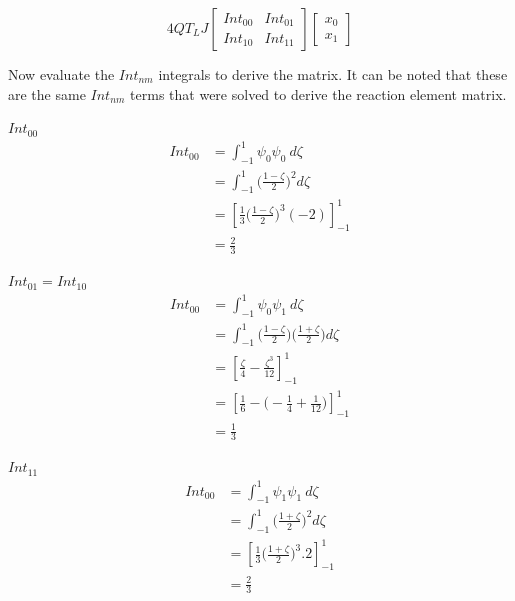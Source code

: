\documentclass[11pt]{article}
\begin{document}
\begin{equation} \label{eq:linSmatrix}
4QT_LJ 
\begin{bmatrix}

Int_{00} & Int_{01} \\
Int_{10} & Int_{11}
\end{bmatrix}
\begin{bmatrix}

x_{0} \\  x_{1} 
\end{bmatrix}
\end{equation}


Now evaluate the $Int_{nm}$ integrals to derive the matrix. It can be noted that these are the same $Int_{nm}$ terms that were solved to derive the reaction element matrix.

\underline{$Int_{00}$} \\
\begin{equation}\label{eq:LSInt00}
\begin{split}
 Int_{00} &= \int_{-1}^{1} \psi_{0}\psi_{0} \ d \zeta \\
&=  \int_{-1}^{1}  \Big ( \frac{1-\zeta}{2} \Big )^2 d\zeta \\
& = \left[ \frac{1}{3} \Big ( \frac{1-\zeta}{2} \Big )^3 (-2) \right]_{-1}^{1} \\
& = \frac{2}{3}
\end{split}
\end{equation}

\underline{$Int_{01} = Int_{10}$} \\

\begin{equation}\label{eq:LSInt01}
\begin{split}
 Int_{00} &= \int_{-1}^{1} \psi_{0}\psi_{1} \ d \zeta \\
&=  \int_{-1}^{1}  \Big ( \frac{1-\zeta}{2} \Big )  \Big ( \frac{1+\zeta}{2} \Big )d\zeta \\
& = \left[ \frac{\zeta}{4} - \frac{\zeta^3}{12}\right]_{-1}^{1} \\
& = \left[ \frac{1}{6} -  \Big (-\frac{1}{4} + \frac{1}{12} \Big )\right]_{-1}^{1} \\
& = \frac{1}{3}
\end{split}
\end{equation}

\pagebreak

\underline{$Int_{11}$} \\
\begin{equation}\label{eq:LSInt00}
\begin{split}
 Int_{00} &= \int_{-1}^{1} \psi_{1}\psi_{1} \ d \zeta \\
&=  \int_{-1}^{1}  \Big ( \frac{1+\zeta}{2} \Big )^2 d\zeta \\
& = \left[ \frac{1}{3} \Big ( \frac{1+\zeta}{2}\Big)^3 . 2 \right]_{-1}^{1} \\
& = \frac{2}{3}
\end{split}
\end{equation}
\end{document}
